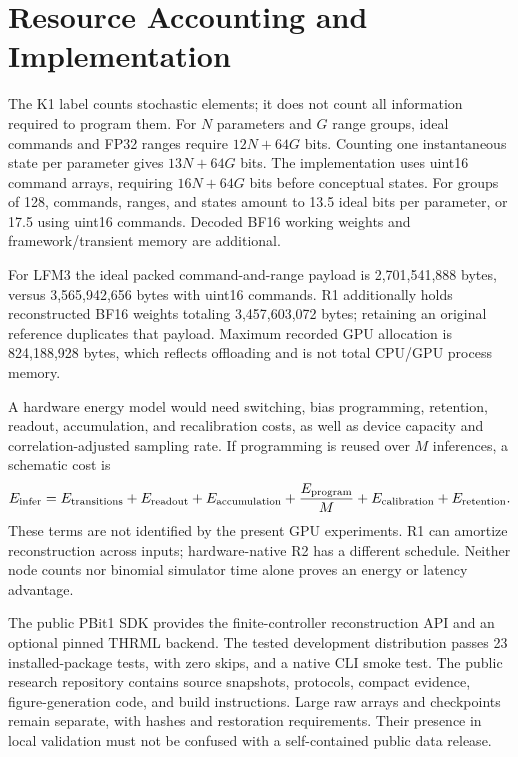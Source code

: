 \documentclass[11pt]{article}
\begin{document}
\section{Resource Accounting and Implementation}
The K1 label counts stochastic elements; it does not count all information required to program them. For $N$ parameters and $G$ range groups, ideal commands and FP32 ranges require $12N+64G$ bits. Counting one instantaneous state per parameter gives $13N+64G$ bits. The implementation uses uint16 command arrays, requiring $16N+64G$ bits before conceptual states. For groups of 128, commands, ranges, and states amount to 13.5 ideal bits per parameter, or 17.5 using uint16 commands. Decoded BF16 working weights and framework/transient memory are additional.

For LFM3 the ideal packed command-and-range payload is 2,701,541,888 bytes, versus 3,565,942,656 bytes with uint16 commands. R1 additionally holds reconstructed BF16 weights totaling 3,457,603,072 bytes; retaining an original reference duplicates that payload. Maximum recorded GPU allocation is 824,188,928 bytes, which reflects offloading and is not total CPU/GPU process memory.

A hardware energy model would need switching, bias programming, retention, readout, accumulation, and recalibration costs, as well as device capacity and correlation-adjusted sampling rate. If programming is reused over $M$ inferences, a schematic cost is
\begin{equation}
 E_{\rm infer}=E_{\rm transitions}+E_{\rm readout}+E_{\rm accumulation}
 +\frac{E_{\rm program}}{M}+E_{\rm calibration}+E_{\rm retention}.
\end{equation}
These terms are not identified by the present GPU experiments. R1 can amortize reconstruction across inputs; hardware-native R2 has a different schedule. Neither node counts nor binomial simulator time alone proves an energy or latency advantage.

The public PBit1 SDK provides the finite-controller reconstruction API and an optional pinned THRML backend. The tested development distribution passes 23 installed-package tests, with zero skips, and a native CLI smoke test. The public research repository contains source snapshots, protocols, compact evidence, figure-generation code, and build instructions. Large raw arrays and checkpoints remain separate, with hashes and restoration requirements. Their presence in local validation must not be confused with a self-contained public data release.
\end{document}
